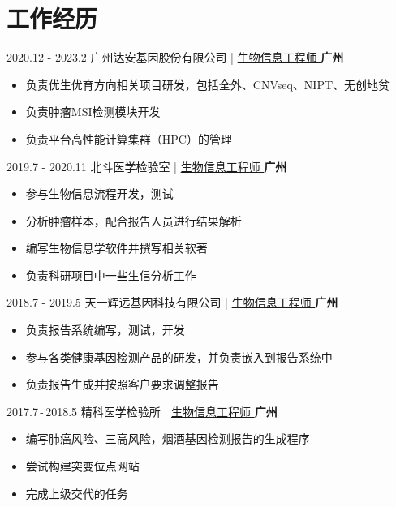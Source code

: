 \documentclass[a4paper]{friggeri-cv_reccius-experiment}
\begin{document}
\section{工作经历}
\begin{entrylist}
    \entry
    {2020.12 - 2023.2\enspace}
    {广州达安基因股份有限公司 | }{ \href{https://en.wikipedia.org/wiki/Bioinformatics}{\small 生物信息工程师 \faMousePointer}}
    {\normalsize\textbf{\color{ipsgreen}\faMapMarker\space 广州}}
    {\jobspace
    \begin{itemize}[leftmargin=*, itemsep = 0.1em]
    \item 负责优生优育方向相关项目研发，包括全外、CNVseq、NIPT、无创地贫
    \item 负责肿瘤MSI检测模块开发
    \item 负责平台高性能计算集群（HPC）的管理\\
    \end{itemize}
    }

  \entry
    {2019.7 - 2020.11\enspace}
    {北斗医学检验室 | }{ \href{https://en.wikipedia.org/wiki/Bioinformatics}{\small 生物信息工程师 \faMousePointer}}
    {\normalsize\textbf{\color{ipsgreen}\faMapMarker\space 广州}}
    {\jobspace
    \begin{itemize}[leftmargin=*, itemsep = 0.1em]
    \item 参与生物信息流程开发，测试
    \item 分析肿瘤样本，配合报告人员进行结果解析
    \item 编写生物信息学软件并撰写相关软著
    \item 负责科研项目中一些生信分析工作\\
    \end{itemize}
    }
    
  \entry
    {2018.7 - 2019.5\enspace}
    {天一辉远基因科技有限公司 | }{ \href{https://en.wikipedia.org/wiki/Bioinformatics}{\small 生物信息工程师 \faMousePointer}}
    {\normalsize\textbf{\color{ipsgreen}\faMapMarker\space 广州}}
    {\jobspace
    \begin{itemize}[leftmargin=*, itemsep = 0.1em]
    \item 负责报告系统编写，测试，开发
    \item 参与各类健康基因检测产品的研发，并负责嵌入到报告系统中
    \item 负责报告生成并按照客户要求调整报告\\
    \end{itemize}
    }
    
  \entry
    {2017.7\,-\,2018.5\enspace}
    {精科医学检验所 | }{\href{https://en.wikipedia.org/wiki/Bioinformatics}{\small 生物信息工程师 \faMousePointer}}
    {\normalsize\textbf{\color{ipsgreen}\faMapMarker\space 广州}}
    {\jobspace
    \begin{itemize}[leftmargin=*, noitemsep]
    \item 编写肺癌风险、三高风险，烟酒基因检测报告的生成程序
    \item 尝试构建突变位点网站
    \item 完成上级交代的任务 \\
    \end{itemize}
    }
    
\end{entrylist}
\end{document}

